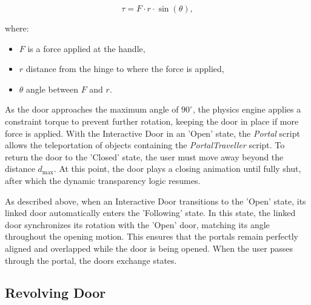 \[
\tau = F \cdot r \cdot \sin(\theta),
\]

where:
\begin{itemize}
  \item \(F\) is a force applied at the handle,
  \item \(r\) distance from the hinge to where the force is applied,
  \item $\theta$ angle between \(F\) and \(r\).
\end{itemize}

As the door approaches the maximum angle of $90^\circ$, the physics engine applies a constraint torque to prevent further rotation, keeping the 
door in place if more force is applied. With the Interactive Door in an 'Open' state, the \textit{Portal} script allows the teleportation of 
objects containing the \textit{PortalTraveller} script. To return the door to the 'Closed' state, the user must 
move away beyond the distance $d_{\max}$. At this point, the door plays a closing animation until fully shut, after which the dynamic transparency 
logic resumes.

As described above, when an Interactive Door transitions to the 'Open' state, its linked door automatically enters the 'Following' state. 
In this state, the linked door synchronizes its rotation with the 'Open' door, matching its angle throughout the opening motion. 
This ensures that the portals remain perfectly aligned and overlapped while the door is being opened. When the user passes through the portal, 
the doors exchange states.

\subsection{Revolving Door}
\label{sec:rev-door}

